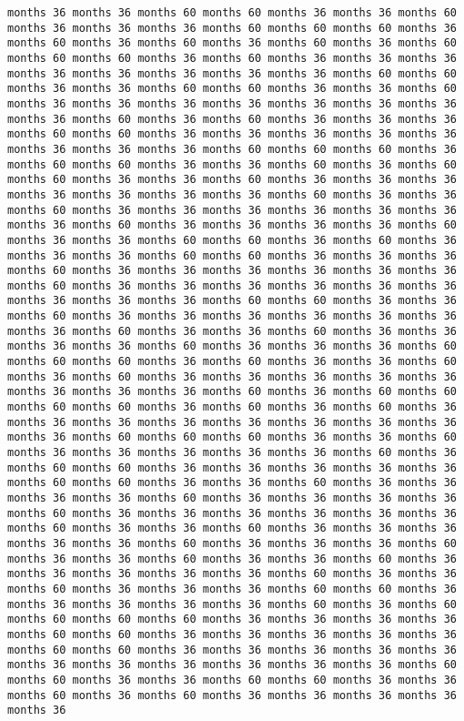 \documentclass[11pt]{article}
\begin{document}
\begin{Verbatim}[commandchars=\\\{\}, frame=single, framerule=2mm, rulecolor=\color{outerrorbackground}]
months 36 months 36 months 60 months 60 months 36 months 36 months 60 months 36 months 36 months 36 months 60 months 60 months 60 months 36 months 60 months 36 months 60 months 36 months 60 months 36 months 60 months 60 months 60 months 36 months 60 months 36 months 36 months 36 months 36 months 36 months 36 months 36 months 36 months 60 months 60 months 36 months 36 months 60 months 60 months 36 months 36 months 60 months 36 months 36 months 36 months 36 months 36 months 36 months 36 months 36 months 60 months 36 months 60 months 36 months 36 months 36 months 60 months 60 months 36 months 36 months 36 months 36 months 36 months 36 months 36 months 36 months 60 months 60 months 60 months 36 months 60 months 60 months 36 months 36 months 60 months 36 months 60 months 60 months 36 months 36 months 60 months 36 months 36 months 36 months 36 months 36 months 36 months 36 months 60 months 36 months 36 months 60 months 36 months 36 months 36 months 36 months 36 months 36 months 36 months 60 months 36 months 36 months 36 months 36 months 60 months 36 months 36 months 60 months 60 months 36 months 60 months 36 months 36 months 36 months 60 months 60 months 36 months 36 months 36 months 60 months 36 months 36 months 36 months 36 months 36 months 36 months 60 months 36 months 36 months 36 months 36 months 36 months 36 months 36 months 36 months 36 months 60 months 60 months 36 months 36 months 60 months 36 months 36 months 36 months 36 months 36 months 36 months 36 months 60 months 36 months 36 months 60 months 36 months 36 months 36 months 36 months 60 months 36 months 36 months 36 months 60 months 60 months 60 months 36 months 60 months 36 months 36 months 60 months 36 months 60 months 36 months 36 months 36 months 36 months 36 months 36 months 36 months 36 months 60 months 36 months 60 months 60 months 60 months 60 months 36 months 60 months 36 months 60 months 36 months 36 months 36 months 36 months 36 months 36 months 36 months 36 months 36 months 60 months 60 months 60 months 36 months 36 months 60 months 36 months 36 months 36 months 36 months 36 months 60 months 36 months 60 months 60 months 36 months 36 months 36 months 36 months 36 months 60 months 60 months 36 months 36 months 60 months 36 months 36 months 36 months 36 months 60 months 36 months 36 months 36 months 36 months 60 months 36 months 36 months 36 months 36 months 36 months 36 months 60 months 36 months 36 months 60 months 36 months 36 months 36 months 36 months 36 months 60 months 36 months 36 months 36 months 60 months 36 months 36 months 60 months 36 months 36 months 60 months 36 months 36 months 36 months 36 months 36 months 60 months 36 months 36 months 60 months 36 months 36 months 36 months 60 months 60 months 36 months 36 months 36 months 36 months 36 months 60 months 36 months 60 months 60 months 60 months 60 months 36 months 36 months 36 months 36 months 60 months 60 months 36 months 36 months 36 months 36 months 36 months 60 months 60 months 36 months 36 months 36 months 36 months 36 months 36 months 36 months 36 months 36 months 36 months 36 months 60 months 60 months 36 months 36 months 60 months 60 months 36 months 36 months 60 months 36 months 60 months 36 months 36 months 36 months 36 months 36 
\end{Verbatim}
\end{document}
